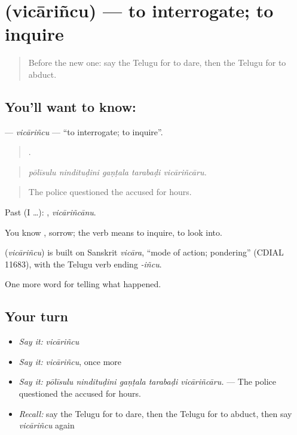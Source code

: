 \section[\texorpdfstring{\te{విచారించు} (vicāriñcu)}{విచారించు (vicāriñcu)}]{ (vicāriñcu) — to interrogate; to inquire}

\label{lesson:TE-C381-vicarincu}



\begin{quote}
Before the new one: say the Telugu for to dare, then the Telugu for to abduct.
\end{quote}

\subsection*{You'll want to know: }
\textbf{} — \emph{vicāriñcu} — \textquotedblleft{}to interrogate; to inquire\textquotedblright{}.

\begin{quote}
    .
\end{quote}

\begin{quote}
\emph{pōlīsulu nindituḍini gaṇṭala tarabaḍi vicāriñcāru.}
\end{quote}

\begin{quote}
The police questioned the accused for hours.
\end{quote}

Past (I …): , \emph{vicāriñcānu}.

You know , sorrow; the verb means to inquire, to look into.

\begin{cousinweb}
\textbf{} (\emph{vicāriñcu}) is built on Sanskrit \emph{vicāra}, \textquotedblleft{}mode of action; pondering\textquotedblright{} (CDIAL 11683), with the Telugu verb ending \emph{-iñcu}.
\end{cousinweb}

\begin{grammarlens}[title={What you've built}]
One more word for telling what happened.
\end{grammarlens}

\subsection*{Your turn}
\begin{itemize}
\raggedright
  \item \emph{Say it:} \emph{vicāriñcu}
  \item \emph{Say it:} \emph{vicāriñcu}, once more
  \item \emph{Say it:} \emph{pōlīsulu nindituḍini gaṇṭala tarabaḍi vicāriñcāru.} — The police questioned the accused for hours.
  \item \emph{Recall:} say the Telugu for to dare, then the Telugu for to abduct, then say \emph{vicāriñcu} again
\end{itemize}

